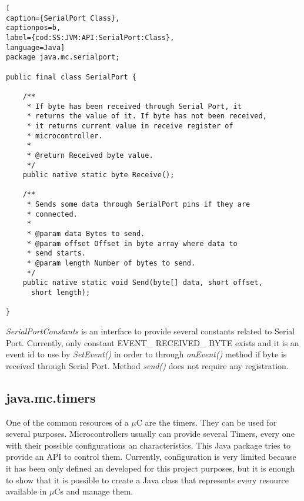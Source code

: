 \medskip
\begin{lstlisting}[
caption={SerialPort Class},
captionpos=b,
label={cod:SS:JVM:API:SerialPort:Class},
language=Java]
package java.mc.serialport;

public final class SerialPort {

    /**
     * If byte has been received through Serial Port, it
     * returns the value of it. If byte has not been received,
     * it returns current value in receive register of
     * microcontroller.
     *
     * @return Received byte value.
     */
    public native static byte Receive();

    /**
     * Sends some data through SerialPort pins if they are
     * connected.
     *
     * @param data Bytes to send.
     * @param offset Offset in byte array where data to
     * send starts.
     * @param length Number of bytes to send.
     */
    public native static void Send(byte[] data, short offset,
      short length);

}
\end{lstlisting}
\medskip

\textit{SerialPortConstants} is an interface to provide several constants related to Serial Port. Currently, only constant EVENT\_ RECEIVED\_ BYTE exists and it is an event id to use by \textit{SetEvent()} in order to through \textit{onEvent()} method if byte is received through Serial Port. Method \textit{send()} does not require any registration.

\subsection{java.mc.timers}\label{SS:JVM:API:Timers}
One of the common resources of a $\mu$C are the timers. They can be used for several purposes. Microcontrollers usually can provide several Timers, every one with their possible configurations an characteristics. This Java package tries to provide an API to control them. Currently, configuration is very limited because it has been only defined an developed for this project purposes, but it is enough to show that it is possible to create a Java class that represents every resource available in $\mu$Cs and manage them.

